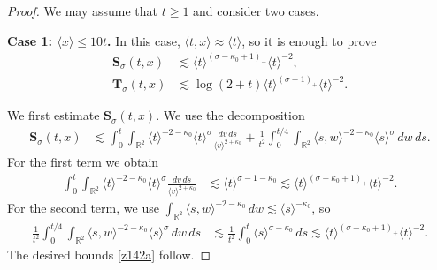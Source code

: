 \documentclass[reqno,11pt]{amsart}
\numberwithin{equation}{section}
\begin{document}
		\begin{proof} We may assume that $t\geq 1$ and consider two cases.
		\medskip
		
		{\bf{Case 1: $\langle x\rangle\leq 10 t$.}} In this case, $\langle t,x\rangle\approx \langle t\rangle$, so it is enough to prove
		\begin{align}
			\mathbf{S}_{\sigma}(t,x)
			&\lesssim
			\langle t\rangle^{(\sigma-\kappa_0+1)_+}\langle t\rangle^{-2},
			\label{z142a}\\
			\mathbf{T}_{\sigma}(t,x)
			&\lesssim
			\log(2+t)\langle t\rangle^{(\sigma+1)_+}\langle t\rangle^{-2}.
			\label{z142b}
		\end{align}

		
		We first estimate $\mathbf{S}_{\sigma}(t,x)$. We use the decomposition
		\begin{align*}
			\mathbf{S}_{\sigma}(t,x)&\lesssim
			\int_0^t\int_{\mathbb R^2}
			\langle t\rangle^{-2-\kappa_0}
			\langle t\rangle^\sigma
			\frac{dv\,ds}{\langle v\rangle^{2+\kappa_0}}+
			\frac1{t^2}
			\int_0^{t/4}
			\int_{\mathbb R^2}\langle s,w\rangle^{-2-\kappa_0}\langle s\rangle^\sigma\,dw\,ds.
		\end{align*}
		For the first term we obtain
		\begin{align*}
			\int_0^t\int_{\mathbb R^2}
			\langle t\rangle^{-2-\kappa_0}
			\langle t\rangle^\sigma
			\frac{dv\,ds}{\langle v\rangle^{2+\kappa_0}}&\lesssim
			\langle t\rangle^{\sigma-1-\kappa_0}
			\lesssim
			\langle t\rangle^{(\sigma-\kappa_0+1)_+}\langle t\rangle^{-2}.
		\end{align*}
		For the second term, we use $\int_{\mathbb R^2}
			\langle s,w\rangle^{-2-\kappa_0}\,dw\lesssim
			\langle s\rangle^{-\kappa_0}$, so
		\begin{align*}
			\frac1{t^2}\int_0^{t/4}
			\int_{\mathbb R^2}\langle s,w\rangle^{-2-\kappa_0}\langle s\rangle^\sigma\,dw\,ds&\lesssim
			\frac1{t^2}
			\int_0^t
			\langle s\rangle^{\sigma-\kappa_0}\,ds
			\lesssim
			\langle t\rangle^{(\sigma-\kappa_0+1)_+}\langle t\rangle^{-2}.
		\end{align*}
		The desired bounds \eqref{z142a} follow.
		

\end{proof}
\end{document}
